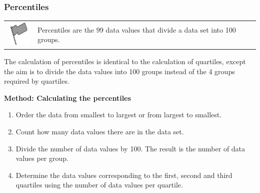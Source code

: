 \begin{description}[noitemsep]
\begin{description}[noitemsep]
            \subsubsection{ Percentiles}
            \nopagebreak
\par
            \label{m39400*fhsst!!!underscore!!!id1960}\begin{definition}
	  \begin{tabular*}{15 cm}{m{15 mm}m{}}
	\hspace*{-50pt}  \includegraphics[width=0.5in]{col11306.imgs/psflag2.png}   & \Definition{   \label{id2624365}\textbf{ Percentiles }} { \label{m39400*meaningfhsst!!!underscore!!!id1960}
          \label{m39400*id214611}Percentiles are the 99 data values that divide a data set into 100 groups. \par 
           } 
      \end{tabular*}
      \end{definition}
          \label{m39400*id214623}The calculation of percentiles is identical to the calculation of quartiles, except the aim is to divide the data values into 100 groups instead of the 4 groups required by quartiles.\par 
          \label{m39400*id214628}
            \textbf{Method: Calculating the percentiles}
          \par 
          \label{m39400*id214635}\begin{enumerate}[noitemsep, label=\textbf{\arabic*}. ] 
            \label{m39400*uid82}\item Order the data from smallest to largest or from largest to smallest.
\label{m39400*uid83}\item Count how many data values there are in the data set.
\label{m39400*uid84}\item Divide the number of data values by 100. The result is the number of data values per group.
\label{m39400*uid85}\item Determine the data values corresponding to the first, second and third quartiles using the number of data values per quartile.
\end{enumerate}

\end{description}
\end{description}
